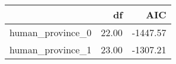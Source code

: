 \begin{table}[ht]
\centering
\begin{tabular}{rrr}
  \hline
 & df & AIC \\ 
  \hline
human\_province\_0 & 22.00 & -1447.57 \\ 
  human\_province\_1 & 23.00 & -1307.21 \\ 
   \hline
\end{tabular}
\end{table}
